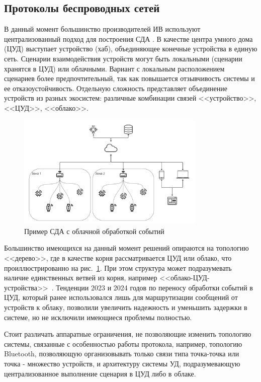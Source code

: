 \documentclass[14pt,a4paper]{extarticle}
\begin{document}
\subsection{Протоколы беспроводных сетей}
В данный момент большинство производителей ИВ используют централизованный подход для построения СДА \cite{Rus_alternative}. В качестве центра умного дома (ЦУД) выступает устройство
(хаб), объединяющее конечные устройства в единую сеть. Сценарии взаимодействия устройств могут быть локальными (сценарии хранятся в ЦУД) или облачными. Вариант с локальным
расположением сценариев более предпочтительный, так как повышается отзывчивость системы и ее отказоустойчивость. Отдельную сложность представляет объединение устройств из разных
экосистем: различные комбинации связей <<устройство>>, <<ЦУД>>, <<облако>>.

\begin{figure}[h]
    \centering
    \includegraphics[width=0.8\textwidth]{images/CommertialAlternativeDesign.png}
    \caption{Пример СДА с облачной обработкой событий}
    \label{fig:cloud_event_processing}
\end{figure}

Большинство имеющихся на данный момент решений опираются на топологию <<дерево>>, где в качестве корня рассматривается ЦУД или облако, что проиллюстрированно на
рис.~\ref{fig:cloud_event_processing}. При этом структура может подразумевать наличие единственных ветвей из корня, например <<облако-ЦУД-устройства>>~\cite{smart_home_review}.
Тенденции 2023 и 2024 годов по переносу обработки событий в ЦУД, который ранее использовался лишь для маршрутизации сообщений от устройств к облаку, позволили увеличить надежность
и уменьшить задержки в системе, но не исключили имеющиеся проблемы полностью.

Стоит различать аппаратные ограничения, не позволяющие изменить топологию системы, связанные с особенностью работы протокола, например, топологию Bluetooth, позволяющую организовывать
только связи типа точка-точка или точка - множество устройств, и архитектуру системы УД, подразумевающую централизованное выполнение сценария в ЦУД либо в облаке.
\end{document}

